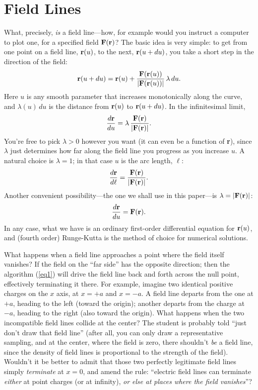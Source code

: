 \documentclass[aps,prb,twocolumn,groupedaddress,noshowpacs,checklength,amsmath]{revtex4-1}
\begin{document}
\section{Field Lines}

What, precisely, {\it is} a field line---how, for example would you instruct a computer to plot one, for a specified field ${\bf F}({\bf r})$?  The basic idea is very simple: to get from one point on a field line, ${\bf r}(u)$, to the next, ${\bf r}(u+du)$, you take a short step in the direction of the field: 
\begin{equation}
{\bf r}(u+du) ={\bf r}(u) + \frac{{\bf F}({\bf r}(u))}{|{\bf F}({\bf r}(u))|}\,\lambda\,du.\label{eq1}
\end{equation} 
Here $u$ is any smooth parameter that increases monotonically along the curve, and $\lambda(u)\,du$ is the distance from ${\bf r}(u)$ to ${\bf r}(u+du)$.  In the infinitesimal limit,
\begin{equation}
\frac{d{\bf r}}{du} = \lambda\,\frac{{\bf F}({\bf r})}{|{\bf F}({\bf r})|}. \label{eq2}
\end{equation}
You're free to pick $\lambda > 0$ however you want (it can even be a function of {\bf r}), since $\lambda$ just determines how far along the field line you progress as you increase $u$.  A natural choice is $\lambda = 1$; in that case $u$ is the arc length, $\ell$:
\begin{equation}
\frac{d{\bf r}}{d\ell} = \frac{\bf F({\bf r})}{|{\bf F}({\bf r})|}.\label{eq2.5}
 \end{equation}
 Another convenient possibility---the one we shall use in this paper---is $\lambda = |{\bf F}({\bf r})|$:
 \begin{equation}
 \frac{d{\bf r}}{du} = {\bf F}({\bf r}).\label{eq2.6}
 \end{equation}
In any case, what we have is an ordinary first-order differential equation for ${\bf r}(u)$, and (fourth order) Runge-Kutta is the method of choice for numerical solutions.\cite{BDES}

What happens when a field line approaches a point where the field itself vanishes?\cite{WTFV}  If the field on the ``far side'' has the opposite direction; then the algorithm (\ref{eq1}) will drive the field line back and forth across the null point, effectively terminating it there.\cite{ETIT} For example, imagine two identical positive charges on the $x$ axis, at $x=+a$ and $x=-a$.  A field line departs from the one at $+a$, heading to the left (toward the origin); another departs from the charge at $-a$, heading to the right (also toward the origin).  What happens when the two incompatible field lines collide at the center?  The student is probably told ``just don't draw that field line'' (after all, you can only draw a representative sampling, and at the center, where the field is zero, there shouldn't {\it be} a field line, since the density of field lines is proportional to the strength of the field).  Wouldn't it be better to admit that those two perfectly legitimate field lines simply {\it terminate} at $x=0$, and amend the rule: ``electric field lines can terminate {\it either} at point charges (or at infinity), {\it or else at places where the field vanishes}''?  
\end{document}
